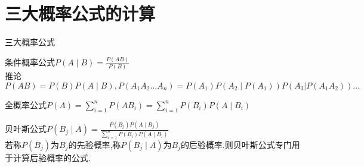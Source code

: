 \documentclass[12pt, a4paper, oneside, UTF8]{ctexbook}
\begin{document}
\section{三大概率公式的计算}
\begin{remark}
    三大概率公式
    \item 条件概率公式\qquad $P(A\mid B)=\frac{P(AB)}{P(B)}$ \\
    推论 $P(AB)=P(B)P(A\mid B), P(A_1A_2\ldots A_n)=P(A_1)P(A_2\mid P(A_1))P(A_3|P(A_1A_2))\ldots$
    \item 全概率公式\qquad $P(A)=\sum_{i=1}^{n}P(AB_i)=\sum_{i=1}^{n}P(B_i)P(A\mid B_i)$
    \item 贝叶斯公式\qquad $P(B_j\mid A)=\frac{P(B_j)P(A\mid B_j)}{\sum_{i=1}^{n}P(B_i)P(A\mid B_i)}$ \\
    若称$P(B_j)$为$B_j$的先验概率,称$P(B_j\mid A)$为$B_j$的后验概率.则贝叶斯公式专门用于计算后验概率的公式.
\end{remark}
\end{document}
